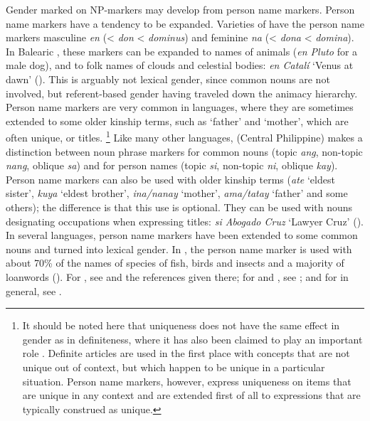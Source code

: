 \documentclass[output=collectionpaper]{langsci/langscibook}
\begin{document}
Gender marked on NP-markers may develop from person name markers. Person name markers have a tendency to be expanded. Varieties of  have the person name markers masculine \textit{en} (< \textit{don} <  \textit{dominus}) and feminine \textit{na} (< \textit{dona} <  \textit{domina}). In Balearic , these markers can be expanded to names of animals (\textit{en Pluto} for a male dog), and to folk names of clouds and celestial bodies: \textit{en Catalí} `Venus at dawn' (\citealt[195--197]{CaroReina2018}). This is arguably not lexical gender, since common nouns are not involved, but referent-based gender having traveled down the animacy hierarchy. Person name markers are very common in  languages, where they are sometimes extended to some older kinship terms, such as `father' and `mother', which are often unique, or titles.%
\footnote{%
It should be noted here that uniqueness does not have the same effect in gender as in definiteness, where it has also been claimed to play an important role \citep{Russell1905,Lyons1999}. Definite articles are used in the first place with concepts that are not unique out of context, but which happen to be unique in a particular situation. Person name markers, however, express uniqueness on items that are unique in any context and are extended first of all to expressions that are typically construed as unique.
} %
Like many other  languages,  (Central Philippine) makes a distinction between noun phrase markers for common nouns (topic \textit{ang}, non-topic \textit{nang}, oblique \textit{sa}) and for person names (topic \textit{si}, non-topic \textit{ni}, oblique \textit{kay}). Person name markers can also be used with older kinship terms (\textit{ate} `eldest sister', \textit{kuya} `eldest brother', \textit{ina/nanay} `mother', \textit{ama/tatay} `father' and some others); the difference is that this use is optional. They can be used with nouns designating occupations when expressing titles: \textit{si Abogado Cruz} `Lawyer Cruz' (\citealt[94]{Schachter1972}). In several  languages, person name markers have been extended to some common nouns and turned into lexical gender. In , the person name marker is used with about 70\% of the names of species of fish, birds and insects and a majority of loanwords (\citealt[166--167]{Johnston1980}). For , see  and the references given there; for  and , see ; and for  in general, see \cite{Handschuh2018}.
\end{document}
